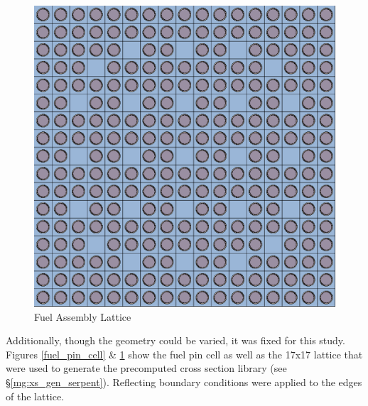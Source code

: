 \begin{figure}[htbp]
\caption{Fuel Assembly Lattice}
\label{lattice}
\begin{center}
\includegraphics[scale=0.25]{multigroup_method/figs/lattice.eps}
\end{center}
\end{figure}

Additionally, though the geometry could be varied, 
it was fixed for this study.  Figures \ref{fuel_pin_cell} \& \ref{lattice} show the fuel pin cell 
as well as the 17x17 lattice that were used to generate the precomputed cross section library 
(see \S \ref{mg:xs_gen_serpent}).  Reflecting boundary conditions were applied to the edges of the lattice.

